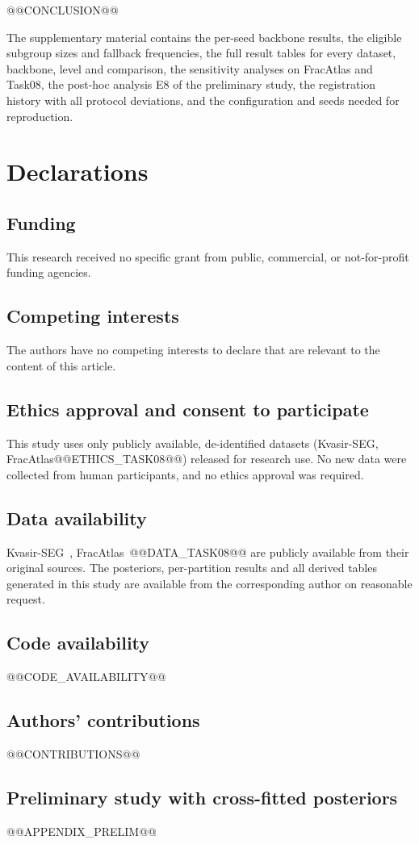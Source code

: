 \documentclass[sn-mathphys-num]{sn-jnl}%
\theoremstyle{thmstyleone}
\theoremstyle{thmstyletwo}
\theoremstyle{thmstylethree}
\newcommand{\1}{\mathbb{1}}
\begin{document}
@@CONCLUSION@@

\backmatter

The supplementary material contains the per-seed backbone results, the eligible subgroup sizes and fallback frequencies, the full result tables for every dataset, backbone, level and comparison, the sensitivity analyses on FracAtlas and Task08, the post-hoc analysis E8 of the preliminary study, the registration history with all protocol deviations, and the configuration and seeds needed for reproduction.

\section*{Declarations}

\subsection*{Funding} This research received no specific grant from public, commercial, or not-for-profit funding agencies.

\subsection*{Competing interests} The authors have no competing interests to declare that are relevant to the content of this article.

\subsection*{Ethics approval and consent to participate} This study uses only publicly available, de-identified datasets (Kvasir-SEG, FracAtlas@@ETHICS_TASK08@@) released for research use. No new data were collected from human participants, and no ethics approval was required.

\subsection*{Data availability} Kvasir-SEG~\cite{jha2020kvasir}, FracAtlas~\cite{abedeen2023fracatlas}@@DATA_TASK08@@ are publicly available from their original sources. The posteriors, per-partition results and all derived tables generated in this study are available from the corresponding author on reasonable request.

\subsection*{Code availability} @@CODE_AVAILABILITY@@

\subsection*{Authors' contributions} @@CONTRIBUTIONS@@

\begin{appendices}

\section{Preliminary study with cross-fitted posteriors}\label{app:prelim}

@@APPENDIX_PRELIM@@

\end{appendices}


\end{document}
